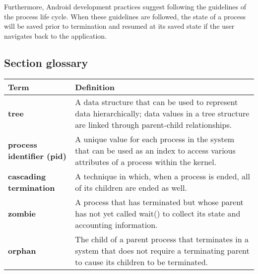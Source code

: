 Furthermore, Android development practices suggest following the guidelines of the process life cycle. When these guidelines are followed, the state of a process will be saved prior to termination and resumed at its saved state if the user navigates back to the application.

\subsection*{Section glossary}
\centering
\begin{tabular}{>{\raggedright}p{} >{\raggedright\arraybackslash}p{}}
\toprule
\textbf{Term} & \textbf{Definition} \\
\midrule
\textbf{tree} & A data structure that can be used to represent data hierarchically; data values in a tree structure are linked through parent-child relationships. \\
\textbf{process identifier (pid)} & A unique value for each process in the system that can be used as an index to access various attributes of a process within the kernel. \\
\textbf{cascading termination} & A technique in which, when a process is ended, all of its children are ended as well. \\
\textbf{zombie} & A process that has terminated but whose parent has not yet called wait() to collect its state and accounting information. \\
\textbf{orphan} & The child of a parent process that terminates in a system that does not require a terminating parent to cause its children to be terminated. \\
\bottomrule
\end{tabular}
\vspace{\baselineskip}

